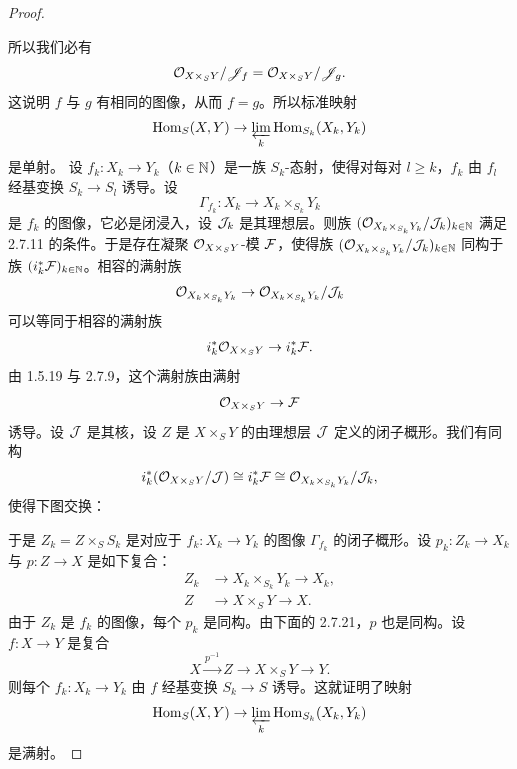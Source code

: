 \begin{proof}
\begin{center}
\begin{tikzcd}
\end{tikzcd}
\end{center}
所以我们必有
\begin{equation*}
\mathcal{O}_{X\times_S Y}/\mathscr{J}_f=\mathcal{O}_{X\times_S Y}/\mathscr{J}_g.
\end{equation*}
这说明 $f$ 与 $g$ 有相同的图像，从而 $f=g$。所以标准映射
\begin{equation*}
\operatorname{Hom}_S(X,Y)\to\varprojlim_k\operatorname{Hom}_{S_k}(X_k,Y_k)
\end{equation*}
是单射。
设 $f_k\colon X_k\to Y_k$（$k\in\mathbb{N}$）是一族 $S_k$-态射，使得对每对 $l\ge k$，$f_k$ 由 $f_l$ 经基变换 $S_k\to S_l$ 诱导。设
\begin{equation*}
\Gamma_{f_k}\colon X_k\to X_k\times_{S_k}Y_k
\end{equation*}
是 $f_k$ 的图像，它必是闭浸入，设 $\mathcal{J}_k$ 是其理想层。则族 $(\mathcal{O}_{X_k\times_{S_k}Y_k}/\mathcal{J}_k)_{k\in\mathbb{N}}$ 满足 2.7.11 的条件。于是存在凝聚 $\mathcal{O}_{X\times_S Y}$-模 $\mathcal{F}$，使得族 $(\mathcal{O}_{X_k\times_{S_k}Y_k}/\mathcal{J}_k)_{k\in\mathbb{N}}$ 同构于族 $(i_k^*\mathcal{F})_{k\in\mathbb{N}}$。相容的满射族
\begin{equation*}
\mathcal{O}_{X_k\times_{S_k}Y_k}\to\mathcal{O}_{X_k\times_{S_k}Y_k}/\mathcal{J}_k
\end{equation*}
可以等同于相容的满射族
\begin{equation*}
i_k^*\mathcal{O}_{X\times_S Y}\to i_k^*\mathcal{F}.
\end{equation*}
由 1.5.19 与 2.7.9，这个满射族由满射
\begin{equation*}
\mathcal{O}_{X\times_S Y}\to\mathcal{F}
\end{equation*}
诱导。设 $\mathcal{J}$ 是其核，设 $Z$ 是 $X\times_S Y$ 的由理想层 $\mathcal{J}$ 定义的闭子概形。我们有同构
\begin{equation*}
i_k^*(\mathcal{O}_{X\times_S Y}/\mathcal{J})\cong i_k^*\mathcal{F}\cong\mathcal{O}_{X_k\times_{S_k}Y_k}/\mathcal{J}_k,
\end{equation*}
使得下图交换：
\begin{center}
\end{center}
于是 $Z_k=Z\times_S S_k$ 是对应于 $f_k\colon X_k\to Y_k$ 的图像 $\Gamma_{f_k}$ 的闭子概形。设 $p_k\colon Z_k\to X_k$ 与 $p\colon Z\to X$ 是如下复合：
\begin{align*}
Z_k&\to X_k\times_{S_k}Y_k\to X_k,\\
Z&\to X\times_S Y\to X.
\end{align*}
由于 $Z_k$ 是 $f_k$ 的图像，每个 $p_k$ 是同构。由下面的 2.7.21，$p$ 也是同构。设 $f\colon X\to Y$ 是复合
\begin{equation*}
X\xrightarrow{p^{-1}}Z\to X\times_S Y\to Y.
\end{equation*}
则每个 $f_k\colon X_k\to Y_k$ 由 $f$ 经基变换 $S_k\to S$ 诱导。这就证明了映射
\begin{equation*}
\operatorname{Hom}_S(X,Y)\to\varprojlim_k\operatorname{Hom}_{S_k}(X_k,Y_k)
\end{equation*}
是满射。
\end{proof}

